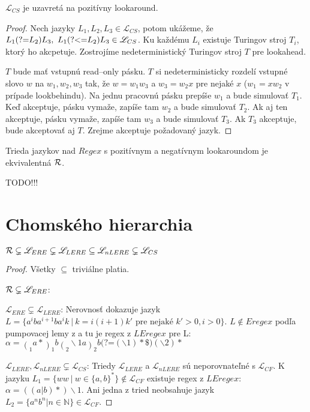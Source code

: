 \documentclass{svk_long_sk}
\def\R{{\cal R}} %
\def\L{\mathscr{L}} %
\def\N{\mathds{N}} %
\def\re{Regex}
\def\e{Eregex}
\def\le{LEregex}
\def\el{\mathscr{L}_{ERE}}
\def\lel{\mathscr{L}_{LERE}}
\def\nlel{\mathscr{L}_{nLERE}}
\def\lookahead{\text{(?=}}
\def\lookbehind{\text{(?\textless =}}
\def\TODO{{\color{red} TODO!!!}}
\begin{document}
\begin{theorem}
$\L_{CS}$ je uzavretá na pozitívny lookaround.
\end{theorem}
\begin{proof}
Nech jazyky $L_1,L_2,L_3\in\L_{CS}$, potom ukážeme, že $L_1\lookahead L_2)L_3, ~L_1\lookbehind L_2) L_3 \in\L_{CS}$. Ku každému $L_i$ existuje Turingov stroj $T_i$, ktorý ho akcpetuje. Zostrojíme nedeterministický Turingov stroj $T$ pre lookahead.

$T$ bude mať vstupnú read--only pásku. $T$ si nedeterministicky rozdelí vstupné slovo $w$ na $w_1,w_2, w_3$ tak, že $w = w_1w_3$ a $w_3=w_2x$ pre nejaké $x$ ($w_1=xw_2$ v prípade lookbehindu). Na jednu pracovnú pásku prepíše $w_1$ a bude simulovať $T_1$. Keď akceptuje, pásku vymaže, zapíše tam $w_2$ a bude simulovať $T_2$. Ak aj ten akceptuje, pásku vymaže, zapíše tam $w_3$ a bude simulovať $T_3$. Ak $T_3$ akceptuje, bude akceptovať aj $T$. Zrejme akceptuje požadovaný jazyk.
\end{proof}

\begin{theorem}
Trieda jazykov nad $\re$ s pozitívnym a negatívnym lookaroundom je ekvivalentná $\R$.
\end{theorem}
\TODO

\section{Chomského hierarchia}
\begin{theorem}
$\R \subsetneq \el \subsetneq \lel \subseteq \nlel \subsetneq \L_{CS}$
\end{theorem}
\begin{proof}

Všetky $\subseteq$ triviálne platia.

$\R \subsetneq \el$: \cite{ExtendedRegexPower}

$\el \subsetneq \lel$: Nerovnosť dokazuje jazyk $L=\lbrace a^iba^{i+1}ba^ik ~|~ k=i(i+1)k' \text{ pre nejaké } k'>0,i>0\rbrace$. $L\notin\e$ podľa pumpovacej lemy z \cite{ExtendedRegexIntersec} a tu je regex z $\le$ pre L: 
$\alpha=\displaystyle{\mathop{(}_1 a*\mathop{)}_1 b \mathop{(}_2 \backslash 1 a \mathop{)}_2 b \lookahead (\backslash 1) *\$ ) (\backslash 2)* }$

$\lel,\nlel \subsetneq \L_{CS}$: Triedy $\lel$ a $\nlel$ sú neporovnateľné s $\L_{CF}$. K jazyku $L_1=\lbrace ww~|~w\in \lbrace a,b \rbrace^*\rbrace \notin \L_{CF}$ existuje regex z $\le$: $\alpha= ((a|b)*)\backslash 1$. Ani jedna z tried neobsahuje jazyk $L_2=\lbrace a^nb^n|n\in\N\rbrace \in \L_{CF}$.
\end{proof}
\end{document}
